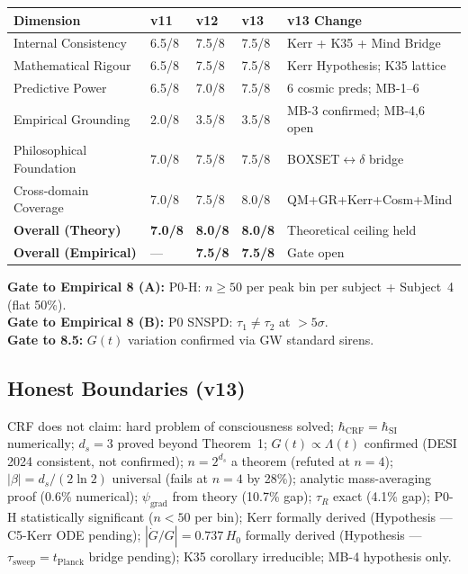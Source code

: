 \documentclass[12pt, a4paper]{article}
\begin{document}
\begin{center}
{\footnotesize
\renewcommand{\arraystretch}{1.35}
\begin{tabular}{p{3.5cm} p{1.1cm} p{1.1cm} p{1.1cm} p{4.8cm}}
\toprule
\textbf{Dimension} & \textbf{v11} & \textbf{v12} & \textbf{v13} & \textbf{v13 Change} \\
\midrule
Internal Consistency & 6.5/8 & 7.5/8 & 7.5/8 & Kerr + K35 + Mind Bridge \\
Mathematical Rigour & 6.5/8 & 7.5/8 & 7.5/8 & Kerr Hypothesis; K35 lattice \\
Predictive Power & 6.5/8 & 7.0/8 & 7.5/8 & 6 cosmic preds; MB-1--6 \\
Empirical Grounding & 2.0/8 & 3.5/8 & 3.5/8 & MB-3 confirmed; MB-4,6 open \\
Philosophical Foundation & 7.0/8 & 7.5/8 & 7.5/8 & BOXSET$\leftrightarrow\delta$ bridge \\
Cross-domain Coverage & 7.0/8 & 7.5/8 & 8.0/8 & QM+GR+Kerr+Cosm+Mind \\
\midrule
\textbf{Overall (Theory)} & \textbf{7.0/8} & \textbf{8.0/8} & \textbf{8.0/8} & Theoretical ceiling held \\
\textbf{Overall (Empirical)} & --- & \textbf{7.5/8} & \textbf{7.5/8} & Gate open \\
\bottomrule
\end{tabular}
}
\end{center}

\begin{center}
\textbf{Gate to Empirical 8 (A):} P0-H: $n \geq 50$ per peak bin per subject + Subject~4 (flat 50\%).\\
\textbf{Gate to Empirical 8 (B):} P0 SNSPD: $\tau_1 \neq \tau_2$ at $>5\sigma$.\\
\textbf{Gate to 8.5:} $G(t)$ variation confirmed via GW standard sirens.
\end{center}

\subsection{Honest Boundaries (v13)}

CRF does not claim: hard problem of consciousness solved; $\hbar_{\mathrm{CRF}} = \hbar_{\mathrm{SI}}$
numerically; $d_s = 3$ proved beyond Theorem~1; $G(t)\propto\Lambda(t)$ confirmed (DESI 2024
consistent, not confirmed); $n = 2^{d_s}$ a theorem (refuted at $n=4$); $|\beta|=d_s/(2\ln 2)$
universal (fails at $n=4$ by 28\%); analytic mass-averaging proof (0.6\% numerical);
$\psi_{\mathrm{grad}}$ from theory (10.7\% gap); $\tau_R$ exact (4.1\% gap); P0-H
statistically significant ($n<50$ per bin); Kerr formally derived (Hypothesis ---
C5-Kerr ODE pending); $|\dot{G}/G|=0.737\,H_0$ formally derived (Hypothesis ---
$\tau_{\mathrm{sweep}}=t_{\mathrm{Planck}}$ bridge pending); K35 corollary irreducible;
MB-4 hypothesis only.
\end{document}
